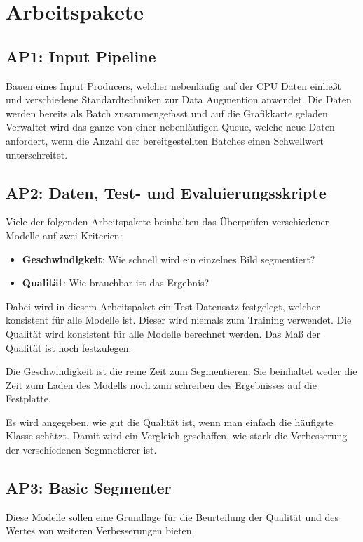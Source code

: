 \section{Arbeitspakete}
\subsection{AP1: Input Pipeline}

Bauen eines Input Producers, welcher nebenläufig auf der CPU Daten einließt und
verschiedene Standardtechniken zur Data Augmention anwendet. Die Daten werden
bereits als Batch zusammengefasst und auf die Grafikkarte geladen. Verwaltet
wird das ganze von einer nebenläufigen Queue, welche neue Daten anfordert, wenn
die Anzahl der bereitgestellten Batches einen Schwellwert unterschreitet.

\subsection{AP2: Daten, Test- und Evaluierungsskripte}
Viele der folgenden Arbeitspakete beinhalten das Überprüfen verschiedener
Modelle auf zwei Kriterien:

\begin{itemize}
    \item \textbf{Geschwindigkeit}: Wie schnell wird ein einzelnes Bild
          segmentiert?
    \item \textbf{Qualität}: Wie brauchbar ist das Ergebnis?
\end{itemize}

Dabei wird in diesem Arbeitspaket ein Test-Datensatz festgelegt, welcher
konsistent für alle Modelle ist. Dieser wird niemals zum Training verwendet.
Die Qualität wird konsistent für alle Modelle berechnet werden. Das Maß der
Qualität ist noch festzulegen.


Die Geschwindigkeit ist die reine Zeit zum Segmentieren. Sie beinhaltet weder
die Zeit zum Laden des Modells noch zum schreiben des Ergebnisses auf die
Festplatte.

Es wird angegeben, wie gut die Qualität ist, wenn man einfach die häufigste Klasse schätzt. Damit wird ein Vergleich geschaffen, wie stark
die Verbesserung der verschiedenen Segmnetierer ist.


\subsection{AP3: Basic Segmenter}
Diese Modelle sollen eine Grundlage für die Beurteilung der Qualität und des
Wertes von weiteren Verbesserungen bieten.

